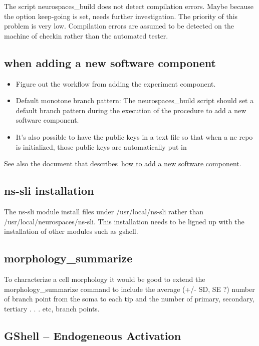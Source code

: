 \documentclass[12pt]{article}
\begin{document}
The script neurospaces\_build does not detect compilation errors.
Maybe because the option keep-going is set, needs further
investigation.  The priority of this problem is very low.  Compilation
errors are assumed to be detected on the machine of checkin rather
than the automated tester.


\subsection{when adding a new software component}

\begin{itemize}
\item Figure out the workflow from adding the experiment component.
\item Default monotone branch pattern: The neurospaces\_build script
  should set a default branch pattern during the execution of the
  procedure to add a new software component.
\item It's also possible to have the public keys in a text file so
  that when a ne repo is initialized, those public keys are
  automatically put in
\end{itemize}

See also the document that
describes~\href{../genesis-addto-component-developerpackage/genesis-addto-component-developerpackage.tex}{how
  to add a new software component}.


\subsection{ns-sli installation}

The ns-sli module install files under /usr/local/ns-sli rather than
/usr/local/neurospaces/ns-sli.  This installation needs to be ligned
up with the installation of other modules such as gshell.


\subsection{morphology\_summarize}

To characterize a cell morphology it would be good to extend the
morphology\_summarize command to include the average (+/- SD, SE ?)
number of branch point from the soma to each tip and the number of
primary, secondary, tertiary . . . etc, branch points.


\subsection{GShell -- Endogeneous Activation}
\end{document}
